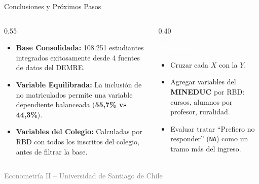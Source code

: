 \documentclass[10pt, aspectratio=169, xcolor=table]{beamer}
\begin{document}
\begin{frame}{Conclusiones y Próximos Pasos}
  \begin{columns}[c]
    \begin{column}{0.55\textwidth}
      \begin{itemize}
        \item \textbf{Base Consolidada:} 108.251 estudiantes integrados exitosamente desde 4 fuentes de datos del DEMRE.
        \item \textbf{Variable Equilibrada:} La inclusión de no matriculados permite una variable dependiente balanceada (\textbf{55,7\% vs 44,3\%}).
        \item \textbf{Variables del Colegio:} Calculadas por RBD con todos los inscritos del colegio, antes de filtrar la base.
      \end{itemize}
    \end{column}

    \begin{column}{0.40\textwidth}
      \begin{block}{\textbf{\textcolor{white}{Hacia la Etapa 2}}}
        \small
        \begin{itemize}
          \item Cruzar cada $X$ con la $Y$.
          \item Agregar variables del \textbf{MINEDUC} por RBD: cursos, alumnos por profesor, ruralidad.
          \item Evaluar tratar ``Prefiero no responder'' (\texttt{NA}) como un tramo más del ingreso.
        \end{itemize}
      \end{block}
    \end{column}
  \end{columns}
\end{frame}

{
\begin{frame}[plain]
  \centering
  \vspace*{1.5cm}

  \vspace{1cm}
  {\small \textcolor{gray}{Econometría II -- Universidad de Santiago de Chile}}
\end{frame}
}
\end{document}
